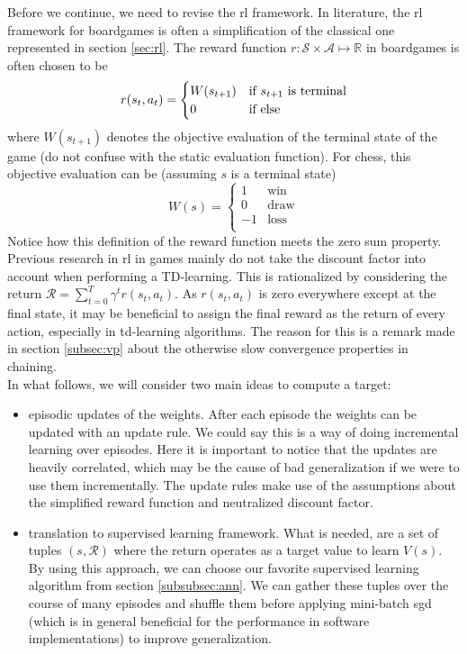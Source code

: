 Before we continue, we need to revise the \gls{rl} framework. In literature, the \gls{rl} framework for boardgames is often a simplification of the classical one represented in section \ref{sec:rl}. The reward function $r:\mathcal{S}\times\mathcal{A}\mapsto \mathbb{R}$ in boardgames is often chosen to be
\begin{equation}
\label{eq:reward}
r(s_t,a_t) = \begin{cases} 
   W(s_{t+1}) & \text{if } s_{t+1} \textnormal{ is terminal} \\
   0 & \text{if } \textnormal{else}
  \end{cases}
\end{equation}
where $W(s_{t+1})$ denotes the objective evaluation of the terminal state of the game (do not confuse with the static evaluation function). For chess, this objective evaluation can be (assuming $s$ is a terminal state)
\begin{equation}
W(s) = \begin{cases} 
   1 & \text{win} \\
   0 & \text{draw} \\
   -1 & \text{loss} \\
  \end{cases}
\end{equation}
Notice how this definition of the reward function meets the zero sum property. \\
Previous research in \gls{rl} in games mainly do not take the discount factor into account when performing a TD-learning. This is rationalized by considering the return $\mathcal{R}=\sum_{t=0}^{T}\gamma^t r(s_t,a_t)$. As $r(s_t,a_t)$ is zero everywhere except at the final state, it may be beneficial to assign the final reward as the return of every action, especially in \gls{td}-learning algorithms. The reason for this is a remark made in section \ref{subsec:vp} about the otherwise slow convergence properties in chaining.\\

In what follows, we will consider two main ideas to compute a target:
\begin{itemize}
\item episodic updates of the weights. After each episode the weights can be updated with an update rule. We could say this is a way of doing incremental learning over episodes. Here it is important to notice that the updates are heavily correlated, which may be the cause of bad generalization if we were to use them incrementally. The update rules make use of the assumptions about the simplified reward function and neutralized discount factor.
\item translation to supervised learning framework. What is needed, are a set of tuples $(s,\mathcal{R})$ where the return operates as a target value to learn $V(s)$. By using this approach, we can choose our favorite supervised learning algorithm from section \ref{subsubsec:ann}. We can gather these tuples over the course of many episodes and shuffle them before applying mini-batch \gls{sgd} (which is in general beneficial for the performance in software implementations) to improve generalization. 
\end{itemize}

